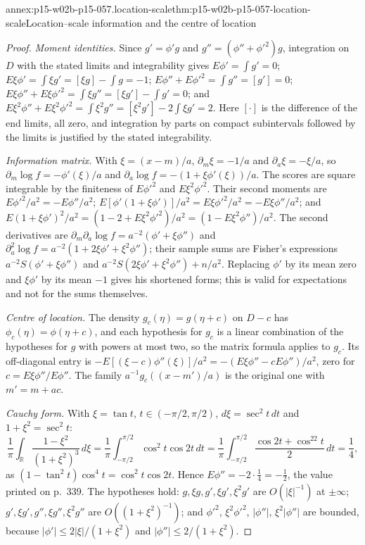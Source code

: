 \begin{annexitem}{annex:p15-w02b-p15-057.location-scale}{thm:p15-w02b-p15-057-location-scale}{Location--scale information and the centre of location}
\begin{proof}
\emph{Moment identities.} Since \(g'=\phi'g\) and
\(g''=(\phi''+\phi'^2)g\), integration on \(D\) with the stated limits and
integrability gives
\(E\phi'=\int g'=0\);
\(E\xi\phi'=\int\xi g'=[\xi g]-\int g=-1\);
\(E\phi''+E\phi'^2=\int g''=[g']=0\);
\(E\xi\phi''+E\xi\phi'^2=\int\xi g''=[\xi g']-\int g'=0\); and
\(E\xi^2\phi''+E\xi^2\phi'^2=\int\xi^2g''=[\xi^2g']-2\int\xi g'=2\).
Here \([\cdot]\) is the difference of the end limits, all zero, and
integration by parts on compact subintervals followed by the limits is
justified by the stated integrability.

\emph{Information matrix.} With \(\xi=(x-m)/a\), \(\partial_m\xi=-1/a\)
and \(\partial_a\xi=-\xi/a\), so
\(\partial_m\log f=-\phi'(\xi)/a\) and
\(\partial_a\log f=-(1+\xi\phi'(\xi))/a\). The scores are square integrable
by the finiteness of \(E\phi'^2\) and \(E\xi^2\phi'^2\). Their second
moments are \(E\phi'^2/a^2=-E\phi''/a^2\);
\(E[\phi'(1+\xi\phi')]/a^2=E\xi\phi'^2/a^2=-E\xi\phi''/a^2\); and
\(E(1+\xi\phi')^2/a^2=(1-2+E\xi^2\phi'^2)/a^2=(1-E\xi^2\phi'')/a^2\).
The second derivatives are
\(\partial_m\partial_a\log f=a^{-2}(\phi'+\xi\phi'')\) and
\(\partial_a^2\log f=a^{-2}(1+2\xi\phi'+\xi^2\phi'')\); their sample sums
are Fisher's expressions \(a^{-2}S(\phi'+\xi\phi'')\) and
\(a^{-2}S(2\xi\phi'+\xi^2\phi'')+n/a^2\). Replacing \(\phi'\) by its mean
zero and \(\xi\phi'\) by its mean \(-1\) gives his shortened forms; this is
valid for expectations and not for the sums themselves.

\emph{Centre of location.} The density \(g_c(\eta)=g(\eta+c)\) on
\(D-c\) has \(\phi_c(\eta)=\phi(\eta+c)\), and each hypothesis for
\(g_c\) is a linear combination of the hypotheses for \(g\) with powers at
most two, so the matrix formula applies to \(g_c\). Its off-diagonal entry
is \(-E[(\xi-c)\phi''(\xi)]/a^2=-(E\xi\phi''-cE\phi'')/a^2\), zero for
\(c=E\xi\phi''/E\phi''\). The family \(a^{-1}g_c((x-m')/a)\) is the
original one with \(m'=m+ac\).

\emph{Cauchy form.} With \(\xi=\tan t\), \(t\in(-\pi/2,\pi/2)\),
\(d\xi=\sec^2t\,dt\) and \(1+\xi^2=\sec^2t\):
\[
 \frac1\pi\int_{\mathbb R}\frac{1-\xi^2}{(1+\xi^2)^3}\,d\xi
 =\frac1\pi\int_{-\pi/2}^{\pi/2}\cos^2t\cos2t\,dt
 =\frac1\pi\int_{-\pi/2}^{\pi/2}\frac{\cos2t+\cos^22t}{2}\,dt
 =\frac14,
\]
as \((1-\tan^2t)\cos^4t=\cos^2t\cos2t\). Hence
\(E\phi''=-2\cdot\tfrac14=-\tfrac12\), the value printed on p.~339.
The hypotheses hold: \(g,\xi g,g',\xi g',\xi^2g'\) are
\(O(|\xi|^{-1})\) at \(\pm\infty\); \(g',\xi g',g'',\xi g'',\xi^2g''\) are
\(O((1+\xi^2)^{-1})\); and \(\phi'^2\), \(\xi^2\phi'^2\), \(|\phi''|\),
\(\xi^2|\phi''|\) are bounded, because \(|\phi'|\leq2|\xi|/(1+\xi^2)\) and
\(|\phi''|\leq2/(1+\xi^2)\).


\end{proof}
\end{annexitem}
